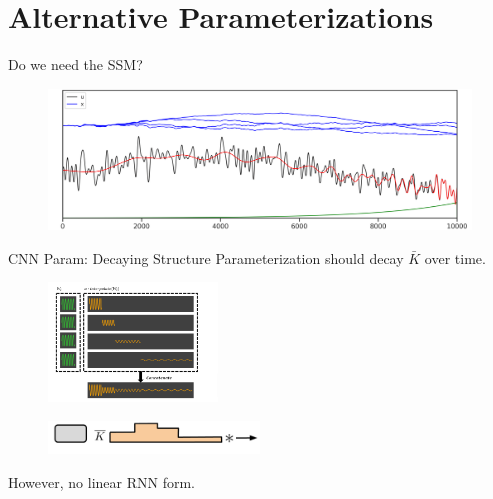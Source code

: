     

\section{Alternative Parameterizations}

\begin{frame}{Do we need the SSM?}
    \begin{figure}
        \centering
            \includegraphics[width=1\textwidth]{Figs/frame_50_delay-0.1s.png}
    \end{figure}
\end{frame}

\begin{frame}{CNN Param: Decaying Structure \cite{Li2022-pn}}
    Parameterization should decay $\bar{K}$ over time.

    \begin{figure}
        \centering
        \includegraphics[width=0.4\textwidth]{Figs/sgconv.png}
        \label{fig:my_label}
    \end{figure}

    \begin{figure}
        \centering
        \includegraphics[width=0.5\textwidth]{Figs/SGParam.pdf}
        \label{fig:my_label}
    \end{figure}

\pause
    \begin{center}
    \alert{However}, no linear RNN form.        
    \end{center}
    
\end{frame}



